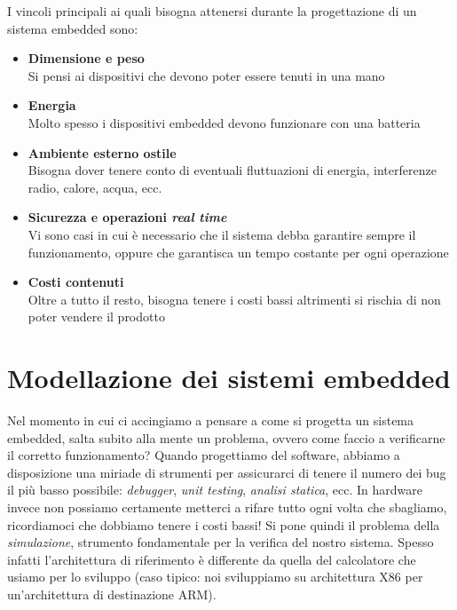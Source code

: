 \documentclass[10pt,a4paper,oneside]{scrbook}
\begin{document}
I vincoli principali ai quali bisogna attenersi durante la progettazione di un sistema embedded sono:
\begin{itemize}
    \item \textbf{Dimensione e peso}\\
          Si pensi ai dispositivi che devono poter essere tenuti in una mano
    \item \textbf{Energia}\\
          Molto spesso i dispositivi embedded devono funzionare con una batteria
    \item \textbf{Ambiente esterno ostile}\\
          Bisogna dover tenere conto di eventuali fluttuazioni di energia, interferenze radio, calore, acqua, ecc.
    \item \textbf{Sicurezza e operazioni \textit{real time}}\\
          Vi sono casi in cui è necessario che il sistema debba garantire sempre il funzionamento, oppure che 
          garantisca un tempo costante per ogni operazione
    \item \textbf{Costi contenuti}\\
          Oltre a tutto il resto, bisogna tenere i costi bassi altrimenti si rischia di non poter vendere il prodotto
\end{itemize}

\chapter{Modellazione dei sistemi embedded}
Nel momento in cui ci accingiamo a pensare a come si progetta un sistema embedded, salta subito alla mente un
problema, ovvero come faccio a verificarne il corretto funzionamento?
Quando progettiamo del software, abbiamo a disposizione una miriade di strumenti per assicurarci di tenere il numero
dei bug il più basso possibile: \textit{debugger}, \textit{unit testing}, \textit{analisi statica}, ecc.
In hardware invece non possiamo certamente metterci a rifare tutto ogni volta che sbagliamo, ricordiamoci che dobbiamo
tenere i costi bassi! Si pone quindi il problema della \textit{simulazione}, strumento fondamentale per la verifica
del nostro sistema. Spesso infatti l'architettura di riferimento è differente da quella del calcolatore che usiamo
per lo sviluppo (caso tipico: noi sviluppiamo su architettura X86 per un'architettura di destinazione ARM).
\end{document}
